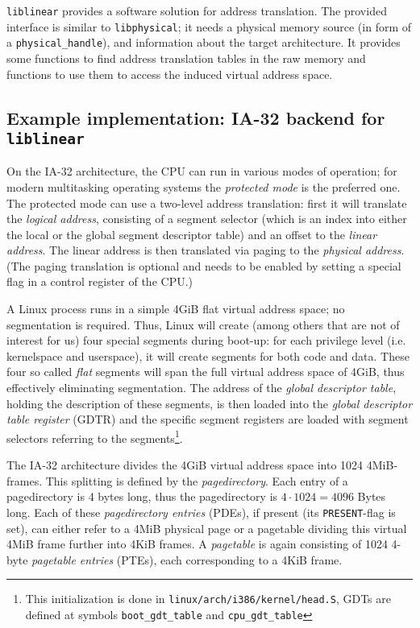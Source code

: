 \texttt{liblinear} provides a software solution for address translation. The
provided interface is similar to \texttt{libphysical}; it needs a physical
memory source (in form of a \texttt{physical\_handle}), and information about
the target architecture. It provides some functions to find address translation
tables in the raw memory and functions to use them to access the induced virtual
address space.



\subsection{Example implementation: IA-32 backend for \texttt{liblinear}}

On the IA-32 architecture, the CPU can run in various modes of operation; for
modern multitasking operating systems the \emph{protected mode} is the preferred
one. The protected mode can use a two-level address translation: first it will
translate the \emph {logical address}, consisting of a segment selector (which
is an index into either the local or the global segment descriptor table) and an
offset to the \emph{linear address}. The linear address is then translated via
paging to the \emph{physical address}. (The paging translation is optional and
needs to be enabled by setting a special flag in a control register of the CPU.)

\label{linux_gdt} A Linux process runs in a simple 4GiB flat virtual address
space; no segmentation is required. Thus, Linux will create (among others that
are not of interest for us) four special segments during boot-up: for each
privilege level (i.e\@. kernelspace and userspace), it will create segments for
both code and data. These four so called \emph{flat} segments will span the full
virtual address space of 4GiB, thus effectively eliminating segmentation. The
address of the \emph{global descriptor table}, holding the description of these
segments, is then loaded into the \emph{global descriptor table register} (GDTR)
and the specific segment registers are loaded with segment selectors referring
to the segments\footnote{This initialization is done in
\texttt{linux/arch/i386/kernel/head.S}, GDTs are defined at symbols
\texttt{boot\_gdt\_table} and \texttt{cpu\_gdt\_table}}.

The IA-32 architecture divides the 4GiB virtual address space into 1024
4MiB-frames. This splitting is defined by the \emph{pagedirectory}. Each entry
of a pagedirectory is 4 bytes long, thus the pagedirectory is $4 \cdot 1024 =
4096$ Bytes long. Each of these \emph{pagedirectory entries} (PDEs), if present
(its \texttt{PRESENT}-flag is set), can either refer to a 4MiB physical page or
a pagetable dividing this virtual 4MiB frame further into 4KiB frames. A
\emph{pagetable} is again consisting of 1024 4-byte \emph{pagetable entries}
(PTEs), each corresponding to a 4KiB frame.

